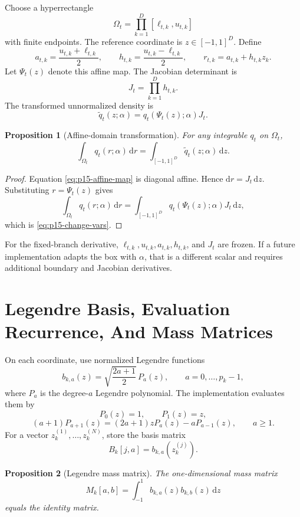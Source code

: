 \documentclass[11pt]{article}
\newcommand{\dd}{\mathrm{d}}
\newtheorem{proposition}{Proposition}
\theoremstyle{definition}
\theoremstyle{remark}
\renewcommand{\[}{\begin{equation}}
\renewcommand{\]}{\end{equation}}
\begin{document}
Choose a hyperrectangle
\[
  \Omega_t=\prod_{k=1}^D[\ell_{t,k},u_{t,k}]
\]
with finite endpoints.  The reference coordinate is \(z\in[-1,1]^D\).  Define
\[
  a_{t,k}=\frac{u_{t,k}+\ell_{t,k}}2,\qquad
  h_{t,k}=\frac{u_{t,k}-\ell_{t,k}}2,\qquad
  r_{t,k}=a_{t,k}+h_{t,k}z_k.
  \label{eq:p15-affine-map}
\]
Let \(\Psi_t(z)\) denote this affine map.  The Jacobian determinant is
\[
  J_t=\prod_{k=1}^D h_{t,k}.
  \label{eq:p15-jacobian}
\]
The transformed unnormalized density is
\[
  \widetilde q_t(z;\alpha)=q_t(\Psi_t(z);\alpha)J_t.
  \label{eq:p15-transformed-q}
\]

\begin{proposition}[Affine-domain transformation]
For any integrable \(q_t\) on \(\Omega_t\),
\[
  \int_{\Omega_t}q_t(r;\alpha)\,\dd r
  =
  \int_{[-1,1]^D}\widetilde q_t(z;\alpha)\,\dd z.
  \label{eq:p15-change-vars}
\]
\end{proposition}

\begin{proof}
Equation \eqref{eq:p15-affine-map} is diagonal affine.  Hence
\(\dd r=J_t\,\dd z\).  Substituting \(r=\Psi_t(z)\) gives
\[
  \int_{\Omega_t}q_t(r;\alpha)\,\dd r
  =
  \int_{[-1,1]^D}q_t(\Psi_t(z);\alpha)J_t\,\dd z,
\]
which is \eqref{eq:p15-change-vars}.
\end{proof}

For the fixed-branch derivative, \(\ell_{t,k},u_{t,k},a_{t,k},h_{t,k}\), and
\(J_t\) are frozen.  If a future implementation adapts the box with
\(\alpha\), that is a different scalar and requires additional boundary and
Jacobian derivatives.

\section{Legendre Basis, Evaluation Recurrence, And Mass Matrices}

On each coordinate, use normalized Legendre functions
\[
  b_{k,a}(z)=\sqrt{\frac{2a+1}{2}}\,P_a(z),
  \qquad a=0,\ldots,p_k-1,
  \label{eq:p15-legendre-basis}
\]
where \(P_a\) is the degree-\(a\) Legendre polynomial.  The implementation
evaluates them by
\[
  P_0(z)=1,\qquad P_1(z)=z,
  \label{eq:p15-legendre-start}
\]
\[
  (a+1)P_{a+1}(z)=(2a+1)zP_a(z)-aP_{a-1}(z),
  \qquad a\ge1.
  \label{eq:p15-legendre-recurrence}
\]
For a vector \(z_k^{(1)},\ldots,z_k^{(N)}\), store the basis matrix
\[
  B_k[j,a]=b_{k,a}(z_k^{(j)}).
  \label{eq:p15-basis-matrix}
\]

\begin{proposition}[Legendre mass matrix]
The one-dimensional mass matrix
\[
  M_k[a,b]=\int_{-1}^{1}b_{k,a}(z)b_{k,b}(z)\,\dd z
  \label{eq:p15-mass}
\]
equals the identity matrix.
\end{proposition}
\end{document}
